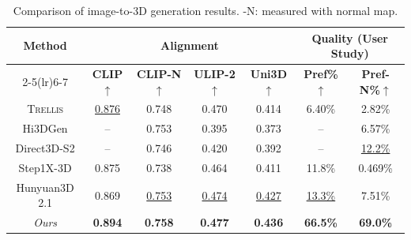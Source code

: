 \documentclass[10pt,twocolumn,letterpaper]{article}
\begin{document}
\begin{table}[t]
        \centering
        \scriptsize
        \caption{Comparison of image-to-3D generation results. -N: measured with normal map.}
        \vspace{-8pt}
        \renewcommand{\arraystretch}{1}
        \setlength{\tabcolsep}{2pt}
        \begin{tabular}{ccccccc}
        \toprule
        \multirow{2}{*}{\textbf{Method}} & \multicolumn{4}{c}{\textbf{Alignment}} & \multicolumn{2}{c}{\textbf{Quality {\tiny(User Study)}}} \\
        [-0.5ex]\cmidrule(lr){2-5}\cmidrule(lr){6-7}
         & \textbf{CLIP$\uparrow$} & \textbf{CLIP{\tiny-N}$\uparrow$} & \textbf{ULIP-2$\uparrow$} & \textbf{Uni3D$\uparrow$} & \textbf{Pref\%$\uparrow$} & \textbf{Pref{\tiny-N}\%$\uparrow$} \\
        \midrule
        \textsc{Trellis} & \underline{\cellcolor[rgb]{1.00,0.91,0.80}0.876} & \cellcolor[rgb]{1.00,1.00,0.80}0.748 & \cellcolor[rgb]{0.84,1.00,0.80}0.470 & \cellcolor[rgb]{0.94,1.00,0.80}0.414 & \cellcolor[rgb]{1.00,0.80,0.80}6.40\% & \cellcolor[rgb]{1.00,0.81,0.80}2.82\% \\
        Hi3DGen & -- & \cellcolor[rgb]{0.90,1.00,0.80}0.753 & \cellcolor[rgb]{1.00,0.80,0.80}0.395 & \cellcolor[rgb]{1.00,0.80,0.80}0.373 & -- & \cellcolor[rgb]{1.00,0.84,0.80}6.57\% \\
        Direct3D-S2 & -- & \cellcolor[rgb]{1.00,0.96,0.80}0.746 & \cellcolor[rgb]{1.00,0.92,0.80}0.420 & \cellcolor[rgb]{1.00,0.92,0.80}0.392 & -- & \underline{\cellcolor[rgb]{1.00,0.87,0.80}12.2\%} \\
        Step1X-3D & \cellcolor[rgb]{1.00,0.89,0.80}0.875 & \cellcolor[rgb]{1.00,0.80,0.80}0.738 & \cellcolor[rgb]{0.87,1.00,0.80}0.464 & \cellcolor[rgb]{0.96,1.00,0.80}0.411 & \cellcolor[rgb]{1.00,0.84,0.80}11.8\% & \cellcolor[rgb]{1.00,0.80,0.80}0.469\% \\
        Hunyuan3D 2.1 & \cellcolor[rgb]{1.00,0.80,0.80}0.869 & \underline{\cellcolor[rgb]{0.89,1.00,0.80}0.753} & \underline{\cellcolor[rgb]{0.81,1.00,0.80}0.474} & \underline{\cellcolor[rgb]{0.86,1.00,0.80}0.427} & \underline{\cellcolor[rgb]{1.00,0.85,0.80}13.3\%} & \cellcolor[rgb]{1.00,0.84,0.80}7.51\% \\
        \textit{Ours} & \textbf{\cellcolor[rgb]{0.80,1.00,0.80}0.894} & \textbf{\cellcolor[rgb]{0.80,1.00,0.80}0.758} & \textbf{\cellcolor[rgb]{0.80,1.00,0.80}0.477} & \textbf{\cellcolor[rgb]{0.80,1.00,0.80}0.436} & \textbf{\cellcolor[rgb]{0.80,1.00,0.80}66.5\%} & \textbf{\cellcolor[rgb]{0.80,1.00,0.80}69.0\%} \\
        \bottomrule
        \end{tabular}
        \vspace{-8pt}
        \label{tab:generation}
\end{table}
\end{document}
